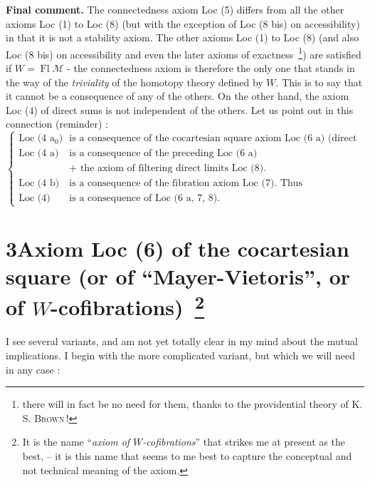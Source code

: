 \documentclass[11pt]{article}
\newcommand{\printedpage}[1]{\marginpar{\footnotesize p.~#1}}
\newcommand{\msp}[1]{\marginpar{\footnotesize [#1]}}
\newcommand{\Fl}{\operatorname{Fl}}
\begin{document}
\textbf{Final comment.} The connectedness axiom Loc (5) differs from all the other axioms Loc (1) to Loc (8) (but with the exception of Loc (8 bis) on accessibility) in that it is not a stability axiom. The other axioms Loc (1) to Loc (8) (and also Loc (8 bis) on accessibility and even the later axioms %
of exactness~\footnote[7]{there will in fact be no need for them, thanks to the providential theory of K. S. \textsc{Brown}\,!}) are satisfied if $W=\Fl\mathcal{M}$ - the connectedness axiom is therefore the only one that stands in the way of the \textit{triviality} of the homotopy theory defined by $W$. This is to say that it cannot be a consequence of any of the others. On the other hand, the axiom Loc (4) of direct sums is not independent of the others. Let us point out in this connection (reminder) :
\[
\left\{
\begin{array}{rl}
\text{Loc (4 a$_0$)} & \text{is a consequence of the cocartesian square axiom Loc (6 a) (direct form).}\\[1ex]
\text{Loc (4 a)} & \text{is a consequence of the preceding Loc (6 a)}\\
 & \text{+ the axiom of filtering direct limits Loc (8).}\\[3ex]
\text{Loc (4 b)} & \text{is a consequence of the fibration axiom Loc (7). Thus}\\[1ex]
\text{Loc (4)} & \text{is a consequence of Loc (6 a, 7, 8).}
\end{array}
\right.
\]

\printedpage{12}
\msp{page 16'}

\section*{3\quad Axiom Loc (6) of the cocartesian square (or of ``Mayer-Vietoris'', or of $W$-cofibrations)~\footnote[8]{It is the name ``\textit{axiom of $W$-cofibrations}'' that strikes me at present as the best, -- it is this name that seems to me best to capture the conceptual and not technical meaning of the axiom.}}

I see several variants, and am not yet totally clear in my mind about the mutual implications. I begin with the more complicated variant, but which we will need in any case :
\end{document}
